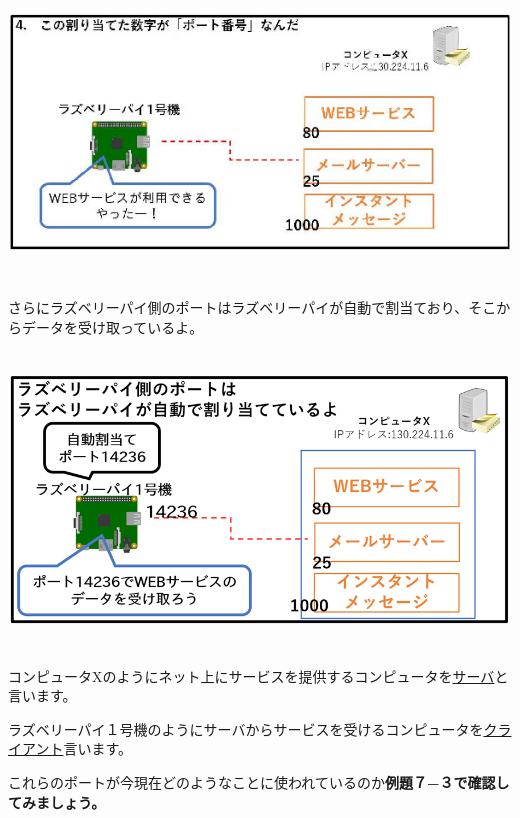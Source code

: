 \documentclass[a4paper,12pt,dvipdfmx]{jarticle}
\begin{document}
\centering
\includegraphics[width=16.875cm,height=7.978cm]{ome7-img024}
\flushleft


\bigskip


\bigskip


\bigskip

さらにラズベリーパイ側のポートはラズベリーパイが自動で割当ており、そこからデータを受け取っているよ。


\bigskip


\bigskip


\bigskip



\centering
\includegraphics[width=15.847cm,height=7.853cm]{ome7-img025.png}
\flushleft

コンピュータXのようにネット上にサービスを提供するコンピュータを\underline{サーバ}と言います。

ラズベリーパイ１号機のようにサーバからサービスを受けるコンピュータを\underline{クライアント}言います。


\bigskip

これらのポートが今現在どのようなことに使われているのか\textbf{例題７−３で確認してみましょう。}
\end{document}
